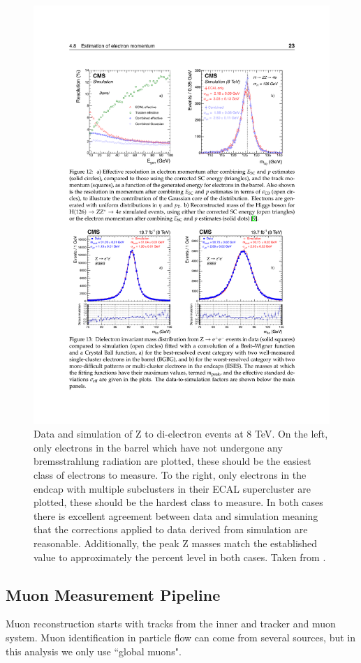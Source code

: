     \begin{figure}[h!]
      \centering
      \includegraphics[width=.7\textwidth]{figures/electron_Z_resolution.pdf}
      \caption{Data and simulation of Z to di-electron events at 8 TeV. On the left, only electrons in the barrel which have not undergone any bremsstrahlung radiation are plotted, these should be the easiest class of electrons to measure. To the right, only electrons in the endcap with multiple subclusters in their ECAL supercluster are plotted, these should be the hardest class to measure. In both cases there is excellent agreement between data and simulation meaning that the corrections applied to data derived from simulation are reasonable. Additionally, the peak Z masses match the established value to approximately the percent level in both cases. Taken from \cite{Electron_reco}.}
      \label{fig:electron_Z_resolution}
    \end{figure}

  \subsection{Muon Measurement Pipeline} \label{sec:muon_measurement_pipeline}
    Muon reconstruction starts with tracks from the inner and tracker and muon system. Muon identification in particle flow can come from several sources, but in this analysis we only use ``global muons". 

